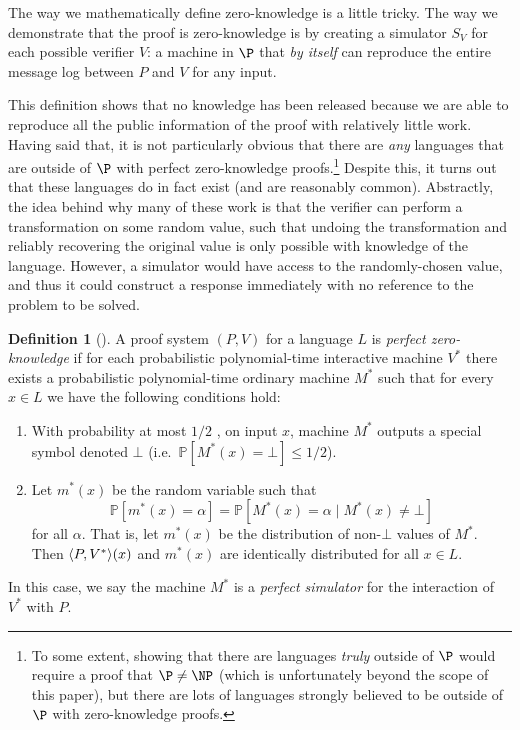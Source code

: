 \documentclass[english]{reedthesis}
\theoremstyle{plain}
\theoremstyle{definition}
\newtheorem{defn}[defn]{Definition}
\theoremstyle{remark}
\DeclarePairedDelimiter{\ang}{\langle}{\rangle}
\begin{document}
The way we mathematically define zero-knowledge is a little tricky. The way we
demonstrate that the proof is zero-knowledge is by creating a simulator $S_{V}$
for each possible verifier $V$: a machine in $\P$ that \emph{by itself} can
reproduce the entire message log between $P$ and $V$ for any input.

This definition shows that no knowledge has been released because we are able to
reproduce all the public information of the proof with relatively little work.
Having said that, it is not particularly obvious that there are \emph{any}
languages that are outside of $\P$ with perfect zero-knowledge
proofs.\footnote{To some extent, showing that there are languages \emph{truly}
  outside of $\P$ would require a proof that $\P \ne \NP$ (which is unfortunately
  beyond the scope of this paper), but there are lots of languages strongly
  believed to be outside of $\P$ with zero-knowledge proofs.} Despite this, it
turns out that these languages do in fact exist (and are reasonably common).
Abstractly, the idea behind why many of these work is that the verifier can
perform a transformation on some random value, such that undoing the
transformation and reliably recovering the original value is only possible with
knowledge of the language. However, a simulator would have access to the
randomly-chosen value, and thus it could construct a response immediately with
no reference to the problem to be solved.

\begin{defn}[{\cite[Def.\ 4.3.1]{Go01}}]\label{def:zero-knowledge}
  A proof system $(P, V)$ for a language $L$ is \emph{perfect zero-knowledge} if
  for each probabilistic polynomial-time interactive machine $V^{*}$ there
  exists a probabilistic polynomial-time ordinary machine $M^{*}$ such that for
  every $x \in L$ we have the following conditions hold:
  \begin{enumerate}
    \item With probability at most $1/2$ , on input $x$, machine $M^{*}$ outputs
          a special symbol denoted $\bot$ (i.e.\ $\mathbb{P}[M^{*}(x) = \bot] \le 1/2$).
    \item Let $m^{*}(x)$ be the random variable such that
          \begin{equation}
            \mathbb{P}[m^{*}(x) = \alpha] = \mathbb{P}[M^{*}(x) = \alpha \mid M^{*}(x) \ne \bot]
          \end{equation}
          for all $\alpha$. That is, let $m^{*}(x)$ be the distribution of non-$\bot$
          values of $M^{*}$. Then $\ang{P, V^{*}}(x)$ and $m^{*}(x)$ are
          identically distributed for all $x \in L$.
  \end{enumerate}
  In this case, we say the machine $M^{*}$ is a \emph{perfect simulator} for the
  interaction of $V^{*}$ with $P$.
\end{defn}
\end{document}
